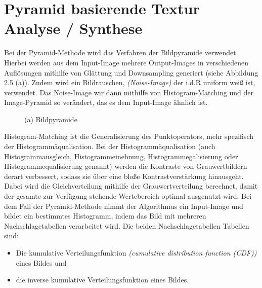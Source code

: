 \documentclass[12pt, a4paper,twoside,openright]{report} %
\begin{document}
\section{Pyramid basierende Textur Analyse / Synthese}

Bei der Pyramid-Methode wird das Verfahren der Bildpyramide verwendet.
Hierbei werden aus dem Input-Image mehrere Output-Images in verschiedenen Auflösungen mithilfe von Glättung und Downsampling generiert {(siehe Abbildung 2.5 (a))}. \cite{Heeger}
\newline
Zudem wird ein Bildrauschen, \textit{(Noise-Image)} der i.d.R uniform weiß ist, verwendet.
Das Noise-Image wir dann mithilfe von Histogram-Matching und der Image-Pyramid so verändert, das es dem Input-Image ähnlich ist.

\begin{figure}[H]
    \centering
    \caption{(a) Bildpyramide}%
\end{figure}

Histogram-Matching ist die Generalisierung des Punktoperators, mehr spezifisch der Histogrammäqualisation.
Bei der Histogrammäqualisation {(auch Histogrammausgleich, Histogrammeinebnung, Histogrammegalisierung oder Histogrammequalisierung genannt)}
werden die Kontraste von Grauwertbildern derart verbessert, sodass sie über eine bloße Kontrastverstärkung hinausgeht.
Dabei wird die Gleichverteilung mithilfe der Grauwertverteilung berechnet, damit der gesamte zur Verfügung stehende Wertebereich optimal ausgenutzt wird. \cite{Lehmann2013}
Bei dem Fall der Pyramid-Methode nimmt der Algorithmus ein Input-Image und bildet ein bestimmtes Histogramm, indem das Bild mit mehreren Nachschlagetabellen verarbeitet wird.
Die beiden Nachschlagetabellen Tabellen sind:

\begin{itemize}
    \item Die kumulative Verteilungsfunktion \textit{(cumulative distribution function (CDF))} eines Bildes und
    \item die inverse kumulative Verteilungsfunktion eines Bildes.
\end{itemize} 
\end{document}
